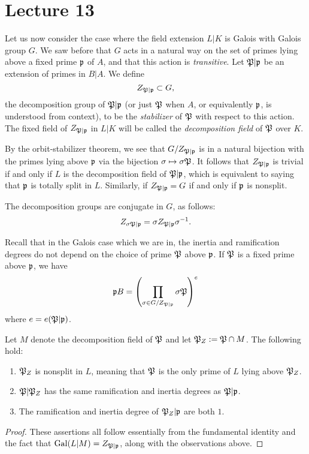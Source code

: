 \section{Lecture 13}

Let us now consider the case where the field extension $L|K$ is Galois with Galois group $G$.
We saw before that $G$ acts in a natural way on the set of primes lying above a fixed prime $\mathfrak{p}$ of $A$, and that this action is \emph{transitive}.
Let $\mathfrak{P}|\mathfrak{p}$ be an extension of primes in $B|A$.
We define
\[ Z_{\mathfrak{P}|\mathfrak{p}} \subset G, \]
the decomposition group of $\mathfrak{P}|\mathfrak{p}$ (or just $\mathfrak{P}$ when $A$, or equivalently $\mathfrak{p}$, is understood from context), to be the \emph{stabilizer} of $\mathfrak{P}$ with respect to this action.
The fixed field of $Z_{\mathfrak{P}|\mathfrak{p}}$ in $L|K$ will be called the \emph{decomposition field} of $\mathfrak{P}$ over $K$.

By the orbit-stabilizer theorem, we see that $G/Z_{\mathfrak{P}|\mathfrak{p}}$ is in a natural bijection with the primes lying above $\mathfrak{p}$ via the bijection $\sigma \mapsto \sigma\mathfrak{P}$.
It follows that $Z_{\mathfrak{P}|\mathfrak{p}}$ is trivial if and only if $L$ is the decomposition field of $\mathfrak{P}|\mathfrak{p}$, which is equivalent to saying that $\mathfrak{p}$ is totally split in $L$.
Similarly, if $Z_{\mathfrak{P}|\mathfrak{p}} = G$ if and only if $\mathfrak{p}$ is nonsplit.

The decomposition groups are conjugate in $G$, as follows:
\[ Z_{\sigma\mathfrak{P}|\mathfrak{p}} = \sigma Z_{\mathfrak{P}|\mathfrak{p}} \sigma^{-1}. \]

Recall that in the Galois case which we are in, the inertia and ramification degrees do not depend on the choice of prime $\mathfrak{P}$ above $\mathfrak{p}$.
If $\mathfrak{P}$ is a fixed prime above $\mathfrak{p}$, we have
\[ \mathfrak{p} B= \left(\prod_{\sigma \in G/Z_{\mathfrak{P}|\mathfrak{p}}} \sigma\mathfrak{P}\right)^{e} \]
where $e = e(\mathfrak{P}|\mathfrak{p})$.

\begin{proposition}
  Let $M$ denote the decomposition field of $\mathfrak{P}$ and let $\mathfrak{P}_{Z} := \mathfrak{P} \cap M$.
  The following hold:
  \begin{enumerate}
    \item $\mathfrak{P}_{Z}$ is nonsplit in $L$, meaning that $\mathfrak{P}$ is the only prime of $L$ lying above $\mathfrak{P}_{Z}$.
    \item $\mathfrak{P}|\mathfrak{P}_{Z}$ has the same ramification and inertia degrees as $\mathfrak{P}|\mathfrak{p}$.
    \item The ramification and inertia degree of $\mathfrak{P}_{Z}|\mathfrak{p}$ are both $1$.
  \end{enumerate}
\end{proposition}
\begin{proof}
  These assertions all follow essentially from the fundamental identity and the fact that $\operatorname{Gal}(L|M) = Z_{\mathfrak{P}|\mathfrak{p}}$, along with the observations above.
\end{proof}

